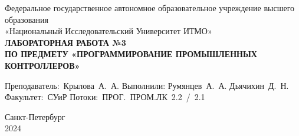 \documentclass[a4paper, 16pt]{article}
\begin{document}
\begin{titlepage}

    \begin{center}
    \vfill
    
    Федеральное государственное автономное образовательное учреждение высшего образования\\
    «Национальный Исследовательский Университет ИТМО»\ \\
    
    \vfill
    {\large\bf ЛАБОРАТОРНАЯ РАБОТА №3\\
        ПО ПРЕДМЕТУ «ПРОГРАММИРОВАНИЕ ПРОМЫШЛЕННЫХ КОНТРОЛЛЕРОВ»}
    \vfill
        
    \begin{flushright}
        \begin{minipage}{.45\textwidth}
        {
            \hbox{Преподаватель: Крылова А. А.}
            \hbox{Выполнили:}
            \hbox{Румянцев А. А.}
            \hbox{Дьячихин Д. Н.}
            \hbox{}
            \hbox{Факультет: СУиР}
            \hbox{Потоки: ПРОГ. ПРОМ.ЛК 2.2 / 2.1}
        }
        \end{minipage}
    \end{flushright}
    
    \vfill
            
    Санкт-Петербург\\
    2024
    \end{center}
    \end{titlepage}
    \setlength{\parskip}{1.5mm}
    
    \tableofcontents

    \newpage
\end{document}
